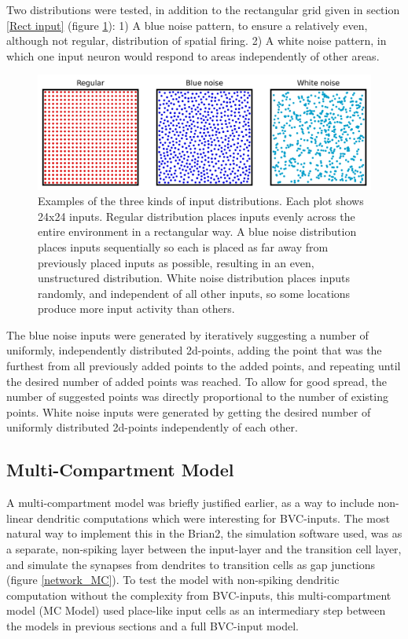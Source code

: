 \documentclass{article}
\begin{document}
    Two distributions were tested, in addition to the rectangular grid given in section \ref{Rect input} (figure \ref{input_distribution}): 1) A blue noise pattern, to ensure a relatively even, although not regular, distribution of spatial firing. 2) A white noise pattern, in which one input neuron would respond to areas independently of other areas.

    \begin{figure}[H]
        \centering
        \begin{minipage}[t]{1\textwidth}
            \includegraphics[width=\textwidth]{distribution_plot.png}
        \end{minipage}
        \caption{Examples of the three kinds of input distributions. Each plot shows 24x24 inputs. Regular distribution places inputs evenly across the entire environment in a rectangular way. A blue noise distribution places inputs sequentially so each is placed as far away from previously placed inputs as possible, resulting in an even, unstructured distribution. White noise distribution places inputs randomly, and independent of all other inputs, so some locations produce more input activity than others.}
        \label{input_distribution}
    \end{figure}
    
    The blue noise inputs were generated by iteratively suggesting a number of uniformly, independently distributed 2d-points, adding the point that was the furthest from all previously added points to the added points, and repeating until the desired number of added points was reached. To allow for good spread, the number of suggested points was directly proportional to the number of existing points.
    White noise inputs were generated by getting the desired number of uniformly distributed 2d-points independently of each other.

    \subsection{Multi-Compartment Model} \label{MC Model}
    A multi-compartment model was briefly justified earlier, as a way to include non-linear dendritic computations which were interesting for BVC-inputs. The most natural way to implement this in the Brian2, the simulation software used, was as a separate, non-spiking layer between the input-layer and the transition cell layer, and simulate the synapses from dendrites to transition cells as gap junctions (figure \ref{network_MC}). To test the model with non-spiking dendritic computation without the complexity from BVC-inputs, this multi-compartment model (MC Model) used place-like input cells as an intermediary step between the models in previous sections and a full BVC-input model.
\end{document}
